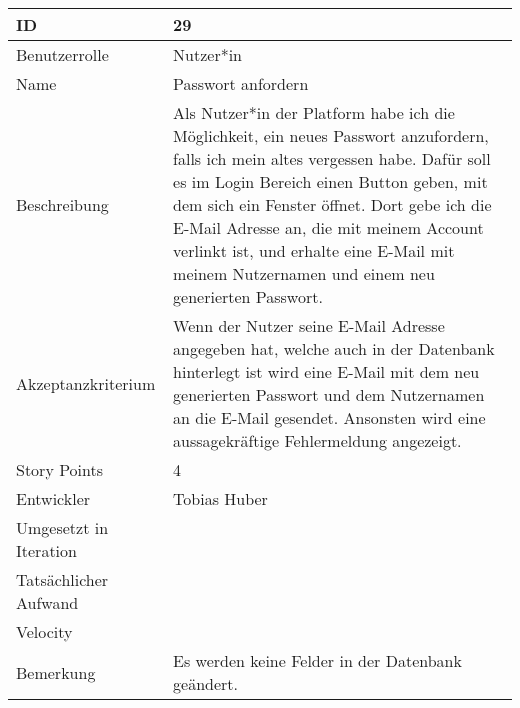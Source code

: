 \begin{tabularx}{\textwidth}{|p{}|X|}
	\hline
	ID & 29 \\
	\hline
	Benutzerrolle & Nutzer*in \\
	\hline
	Name & Passwort anfordern\\
	\hline
	Beschreibung & Als Nutzer*in der Platform habe ich die Möglichkeit, ein neues Passwort anzufordern, falls ich mein altes vergessen habe. Dafür soll es im Login Bereich einen Button geben, mit dem sich ein Fenster öffnet. Dort gebe ich die E-Mail Adresse an, die mit meinem Account verlinkt ist, und erhalte eine E-Mail mit meinem Nutzernamen und einem neu generierten Passwort. \\
	\hline
	Akzeptanzkriterium & Wenn der Nutzer seine E-Mail Adresse angegeben hat, welche auch in der Datenbank hinterlegt ist wird eine E-Mail mit dem neu generierten Passwort und dem Nutzernamen an die E-Mail gesendet. Ansonsten wird eine aussagekräftige Fehlermeldung angezeigt. \\
	\hline
	Story Points & 4\\
	\hline
	Entwickler & Tobias Huber\\
	\hline
	Umgesetzt in Iteration & \\
	\hline
	Tatsächlicher Aufwand & \\
	\hline
	Velocity & \\
	\hline
	Bemerkung & Es werden keine Felder in der Datenbank geändert.\\
	\hline
\end{tabularx}
\vspace{20pt}
